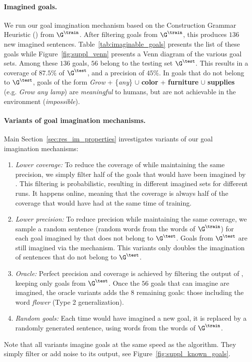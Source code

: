 \clearpage

\paragraph{Imagined goals.} We run our goal imagination mechanism based on the Construction Grammar Heuristic (\CGH) from $\G^\train$. After filtering goals from $\G^\train$, this produces $136$ new imagined sentences. Table~\ref{tab:imaginable_goals} presents the list of these goals while Figure~\ref{fig:suppl_venn} presents a Venn diagram of the various goal sets. Among these $136$ goals, $56$ belong to the testing set $\G^\test$. This results in a coverage of $87.5\%$ of $\G^\test$, and a precision of $45\%$. In goals that do not belong to $\G^\test$, goals of the form \textit{Grow} + \{\textit{any}\} $\cup$ \textbf{color} + \textbf{furniture} $\cup$ \textbf{supplies} (e.g. \textit{Grow any lamp}) are \textit{meaningful} to humans, but are not achievable in the environment (\textit{impossible}).  

\paragraph{Variants of goal imagination mechanisms.}
Main Section~\ref{sec:res_im_properties} investigates variants of our goal imagination mechanisms:
\begin{enumerate}
    \item \textit{Lower coverage:} To reduce the coverage of \CGH while maintaining the same precision, we simply filter half of the goals that would have been imagined by \CGH. This filtering is probabilistic, resulting in different imagined sets for different runs. It happens online, meaning that the coverage is always half of the coverage that \CGH would have had at the same time of training.
    \item \textit{Lower precision:} To reduce precision while maintaining the same coverage, we sample a random sentence (random words from the words of $\G^\train$) for each goal imagined by \CGH that does not belong to $\G^\test$. Goals from $\G^\test$ are still imagined via the \CGH mechanism. This variants only doubles the imagination of sentences that do not belong to $\G^\test$.
    \item \textit{Oracle:} Perfect precision and coverage is achieved by filtering the output of \CGH, keeping only goals from $\G^\test$. Once the $56$ goals that \CGH can imagine are imagined, the oracle variants adds the $8$ remaining goals: those including the word \textit{flower} (Type 2 generalization).
    \item \textit{Random goals:} Each time \CGH would have imagined a new goal, it is replaced by a randomly generated sentence, using words from the words of $\G^\train$.
\end{enumerate}
Note that all variants imagine goals at the same speed as the \CGH algorithm. They simply filter or add noise to its output, see Figure~\ref{fig:suppl_known_goals}.


